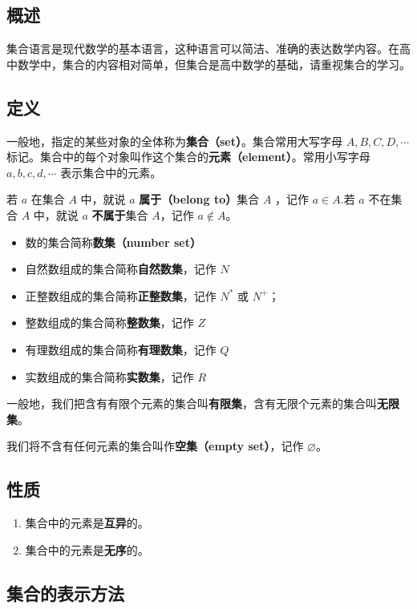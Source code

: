 
\subsection{概述}
集合语言是现代数学的基本语言，这种语言可以简洁、准确的表达数学内容。在高中数学中，集合的内容相对简单，但集合是高中数学的基础，请重视集合的学习。

\subsection{定义}
一般地，指定的某些对象的全体称为\textbf{集合（set）}。集合常用大写字母 $A,B,C,D,\cdots$ 标记。集合中的每个对象叫作这个集合的\textbf{元素（element）}。常用小写字母 $a,b,c,d,\cdots$ 表示集合中的元素。

若 $a$ 在集合 $A$ 中，就说 $a$ \textbf{属于（belong to）}集合 $A$ ，记作 $a \in A$.若 $a$ 不在集合 $A$ 中，就说 $a$ \textbf{不属于}集合 $A$，记作 $a\notin A$。

\begin{itemize}
\item 数的集合简称\textbf{数集（number set）}
\item 自然数组成的集合简称\textbf{自然数集}，记作 $N$
\item 正整数组成的集合简称\textbf{正整数集}，记作 $N^{*}$ 或 $N^{+}$； 
\item 整数组成的集合简称\textbf{整数集}，记作 $Z$
\item 有理数组成的集合简称\textbf{有理数集}，记作 $Q$
\item 实数组成的集合简称\textbf{实数集}，记作 $R$
\end{itemize}

一般地，我们把含有有限个元素的集合叫\textbf{有限集}，含有无限个元素的集合叫\textbf{无限集}。

我们将不含有任何元素的集合叫作\textbf{空集（empty set）}，记作 $\varnothing$。
\subsection{性质}
\begin{enumerate}
\item 集合中的元素是\textbf{互异}的。
\item 集合中的元素是\textbf{无序}的。
\end{enumerate}

\subsection{集合的表示方法}

